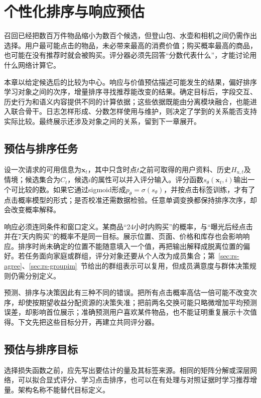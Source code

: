 \chapter{个性化排序与响应预估}
\label{chap:rs-ranking}

召回已经把数百万件物品缩小为数百个候选，但登山包、水壶和相机之间仍需作出选择。用户最可能点击的物品，未必带来最高的消费价值；购买概率最高的商品，也可能在没有推荐时就会被购买。评分器必须先回答“分数代表什么”，才能讨论用什么网络计算它。

本章以给定候选后的比较为中心。响应与价值预估描述可能发生的结果，偏好排序学习对象之间的次序，增量排序寻找推荐能改变的结果。确定目标后，字段交互、历史行为和语义内容提供不同的计算依据；这些依据既能由分离模块融合，也能进入联合骨干。日志怎样形成、分数怎样使用与维护，则决定了学到的关系能否支持实际比较。最终展示还涉及对象之间的关系，留到下一章展开。

\section{预估与排序任务}
\label{sec:rs-ranking-task}

设一次请求的可用信息为$\bm{x}_t$，其中只含时点$t$之前可取得的用户资料、历史$H_{u,t}$及情境；候选集合为$C_t$，候选$i$的属性可以并入评分输入。评分函数$s_\theta(\bm{x}_t,i)$输出一个可比较的数。如果它通过sigmoid形成$p_\theta=\sigma(s_\theta)$，并按点击标签训练，才有了点击概率模型的形式；是否校准还需数据检验。任意单调变换都保持排序次序，却会改变概率解释。

响应必须连同条件和窗口定义。某商品“24小时内购买”的概率，与“曝光后经点击并在7天内购买”的概率不是同一目标。展示位置、页面、价格和库存也会影响响应。排序时尚未确定的位置不能随意填入一个值，再把输出解释成脱离位置的偏好。若任务面向家庭或群组，评分对象还要从个人改为成员集合；第~\ref{sec:rs-agree}、\ref{sec:rs-groupim}~节给出的群组表示可以复用，但成员满意度与群体决策规则仍需分别定义。

预测、排序与决策因此有三种不同的错误。把所有点击概率高估一倍可能不改变次序，却使按期望收益分配资源的决策失准；把前两名交换可能只略微增加平均预测误差，却影响首位展示；准确预测用户喜欢某件物品，也不能证明重复展示十次值得。下文先把这些目标分开，再建立共同评分器。

\section{预估与排序目标}
\label{sec:rs-ranking-objectives}

选择损失函数之前，应先写出要估计的量及其标签来源。相同的矩阵分解或深层网络，可以拟合显式评分、学习点击排序，也可以在有处理与对照证据时学习推荐增量。架构名称不能替代目标定义。

